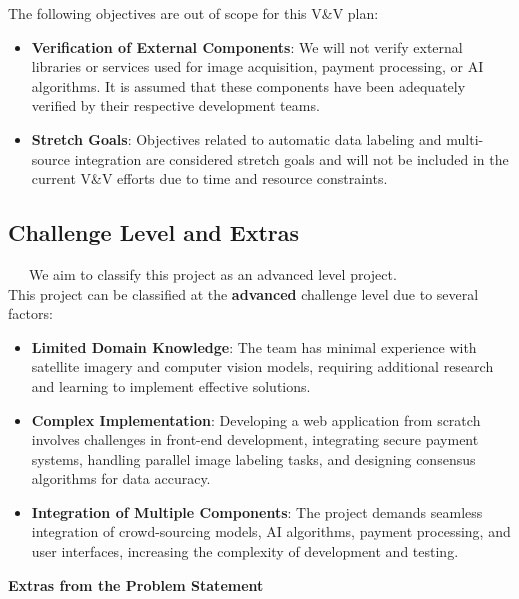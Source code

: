 \documentclass[12pt, titlepage]{article}
\begin{document}
  The following objectives are out of scope for this V\&V plan:
  
  \begin{itemize}
      \item \textbf{Verification of External Components}: We will not verify external libraries or services used for image acquisition, payment processing, or AI algorithms. It is assumed that these components have been adequately verified by their respective development teams.
      \item \textbf{Stretch Goals}: Objectives related to automatic data labeling and multi-source integration are considered stretch goals and will not be included in the current V\&V efforts due to time and resource constraints.
  \end{itemize}
  
  \subsection{Challenge Level and Extras}\cite{Development_Plan} \cite{Problem_Statement}
  
  \, \, \, We aim to classify this project as an advanced level project. \\

  This project can be classified at the \textbf{advanced} challenge level due to several factors:
  
  \begin{itemize}
      \item \textbf{Limited Domain Knowledge}: The team has minimal experience with satellite imagery and computer vision models, requiring additional research and learning to implement effective solutions.
      \item \textbf{Complex Implementation}: Developing a web application from scratch involves challenges in front-end development, integrating secure payment systems, handling parallel image labeling tasks, and designing consensus algorithms for data accuracy.
      \item \textbf{Integration of Multiple Components}: The project demands seamless integration of crowd-sourcing models, AI algorithms, payment processing, and user interfaces, increasing the complexity of development and testing.
  \end{itemize}
  

\textbf{Extras from the Problem Statement} \cite{Problem_Statement}
\end{document}

